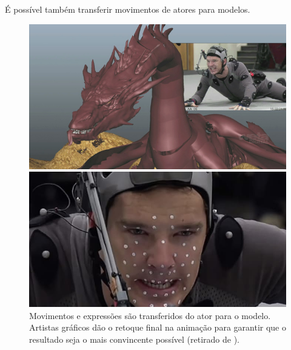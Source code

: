 \documentclass[brazil]{beamer}
\begin{document}
\begin{frame}
  É possível também transferir movimentos de atores para modelos.
  \begin{figure}[ht]
        \begin{minipage}[b]{0.45\linewidth}
            \centering
            \includegraphics[width = 1.0\textwidth, keepaspectratio]{./img/smaug_left.jpg}
        \end{minipage}
        \begin{minipage}[b]{0.45\linewidth}
          \centering
              \includegraphics[width = 1.0\textwidth, keepaspectratio]{./img/smaug_right.jpg}
        \end{minipage}

        \caption{Movimentos e expressões são transferidos do ator para o modelo.
       Artistas gráficos dão o retoque final na animação para garantir que o
     resultado seja o mais convincente possível (retirado de \cite{sherlocksmaug}). }
      \end{figure}
\end{frame}
\end{document}
